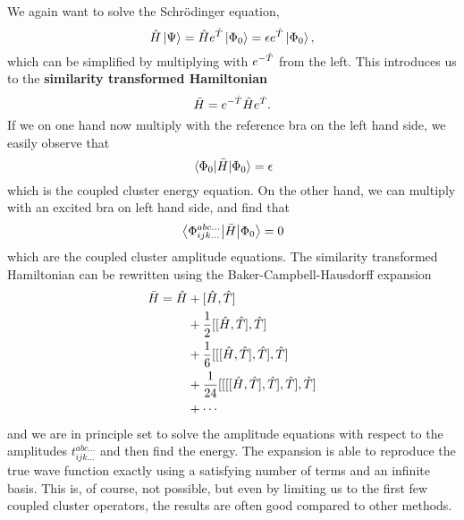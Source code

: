 We again want to solve the Schrödinger equation,
\begin{equation}
\hat{H}\ket{\Psi}=\hat{H}e^{\hatT}\ket{\Phi_0}=\epsilon e^{\hatT}\ket{\Phi_0},
\end{equation}
which can be simplified by multiplying with $e^{-\hat{T}}$ from the left. This introduces us to the \textbf{similarity transformed Hamiltonian} 
\begin{equation}
\bar{H}=e^{-\hat{T}}\hat{H}e^{\hat{T}}.
\end{equation}
If we on one hand now multiply with the reference bra on the left hand side, we easily observe that
\begin{equation}
\mel{\Phi_0}{\bar{H}}{\Phi_0}=\epsilon
\end{equation}
which is the coupled cluster energy equation. On the other hand, we can multiply with an excited bra on left hand side, and find that
\begin{equation}
\mel{\Phi_{ijk\hdots}^{abc\hdots}}{\bar{H}}{\Phi_0}=0
\end{equation}
which are the coupled cluster amplitude equations. The similarity transformed Hamiltonian can be rewritten using the Baker-Campbell-Hausdorff expansion
\begin{align}
\label{eq:BCH}
\bar{H} = \hat{H} &+ [\hat{H},\hat{T}]\notag \\
&+ \frac{1}{2}[[\hat{H},\hat{T}],\hat{T}]\notag \\
&+ \frac{1}{6}[[[\hat{H},\hat{T}],\hat{T}],\hat{T}] \\
&+ \frac{1}{24}[[[[\hat{H},\hat{T}],\hat{T}],\hat{T}],\hat{T}] \notag \\
&+ \cdots \notag
\end{align}
and we are in principle set to solve the amplitude equations with respect to the amplitudes $t_{ijk\hdots}^{abc\hdots}$ and then find the energy. The expansion is able to reproduce the true wave function exactly using a satisfying number of terms and an infinite basis. This is, of course, not possible, but even by limiting us to the first few coupled cluster operators, the results are often good compared to other methods. \cite{crawford}